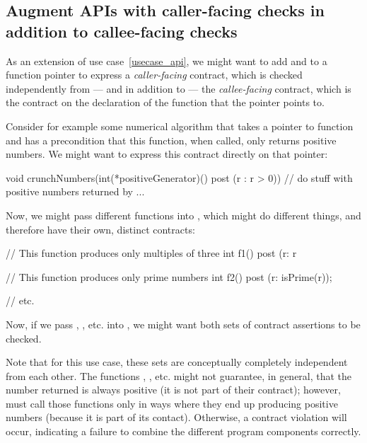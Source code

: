 
\subsection{Augment APIs with caller-facing checks in addition to callee-facing checks}
\label{usecase_callercallee}
As an extension of use case~\ref{usecase_api}, we might want to add  and  to a function pointer to express a \emph{caller-facing} contract, which is checked independently from --- and in addition to --- the \emph{callee-facing} contract, which is the contract on the declaration of the function that the pointer points to.

Consider for example some numerical algorithm  that takes a pointer to function and has a precondition that this function, when called, only returns positive numbers. We might want to express this contract directly on that pointer:
\begin{codeblock}
void crunchNumbers(int(*positiveGenerator)() post (r : r > 0)) {
  // do stuff with positive numbers returned by ...
}
\end{codeblock}
Now, we might pass different functions into , which might do different things, and therefore have their own, distinct contracts:
\begin{codeblock}
// This function produces only multiples of three
int f1() post (r: r %

// This function produces only prime numbers
int f2() post (r: isPrime(r));

// etc.
\end{codeblock}
Now, if we pass , , etc. into , we might want both sets of contract assertions to be checked.

Note that for this use case, these sets are conceptually completely independent from each other. The functions , , etc. might not guarantee, in general, that the number returned is always positive (it is not part of their contract); however,  must call those functions only in ways where they end up producing positive numbers (because it is part of its contact). Otherwise, a contract violation will occur, indicating a failure to combine the different program components correctly.


